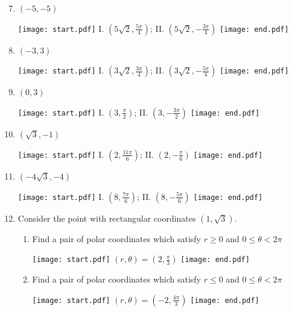 \documentclass[12pt]{article}
\begin{document}

\begin{enumerate}
\setcounter{enumi}{6}

\item $(-5, -5)$ 

\texttt{[image: start.pdf]}
{{I. $\left(5\sqrt{2},\frac{5\pi}{4}\right)$; II. $\left(5\sqrt{2},-\frac{3\pi}{4}\right)$}}
\texttt{[image: end.pdf]}


\item $(-3, 3)$ 

\texttt{[image: start.pdf]}
{{I. $\left(3\sqrt{2},\frac{3\pi}{4}\right)$; II. $\left(3\sqrt{2},-\frac{5\pi}{4}\right)$}}
\texttt{[image: end.pdf]}


\item $(0,3)$ 

\texttt{[image: start.pdf]}
{{I. $\left(3,\frac{\pi}{2}\right)$; II. $\left(3,-\frac{3\pi}{2}\right)$}}
\texttt{[image: end.pdf]}


\item $\left(\sqrt{3}, -1\right)$ 

\texttt{[image: start.pdf]}
{{I. $\left(2,\frac{11\pi}{6}\right)$; II. $\left(2,-\frac{\pi}{6}\right)$}}
\texttt{[image: end.pdf]}


\item $\left(-4\sqrt{3}, -4\right)$ 

\texttt{[image: start.pdf]}
{{I. $\left(8,\frac{7\pi}{6}\right)$; II. $\left(8,-\frac{5\pi}{6}\right)$}}
\texttt{[image: end.pdf]}


\item Consider the point with rectangular coordinates $\left(1,\sqrt{3}\right)$.

\begin{enumerate}

\item Find a pair of polar coordinates which satisfy $r \geq 0$ and $0 \leq \theta< 2\pi$

\texttt{[image: start.pdf]}
{{$(r,\theta)=\left(2,\frac{\pi}{3}\right)$}}
\texttt{[image: end.pdf]}


\item Find a pair of polar coordinates which satisfy $r \leq 0$ and $0 \leq \theta <2\pi$

\texttt{[image: start.pdf]}
{{$(r,\theta)=\left(-2,\frac{4\pi}{3}\right)$}}
\texttt{[image: end.pdf]}



\end{enumerate}
\end{enumerate}
\end{document}
